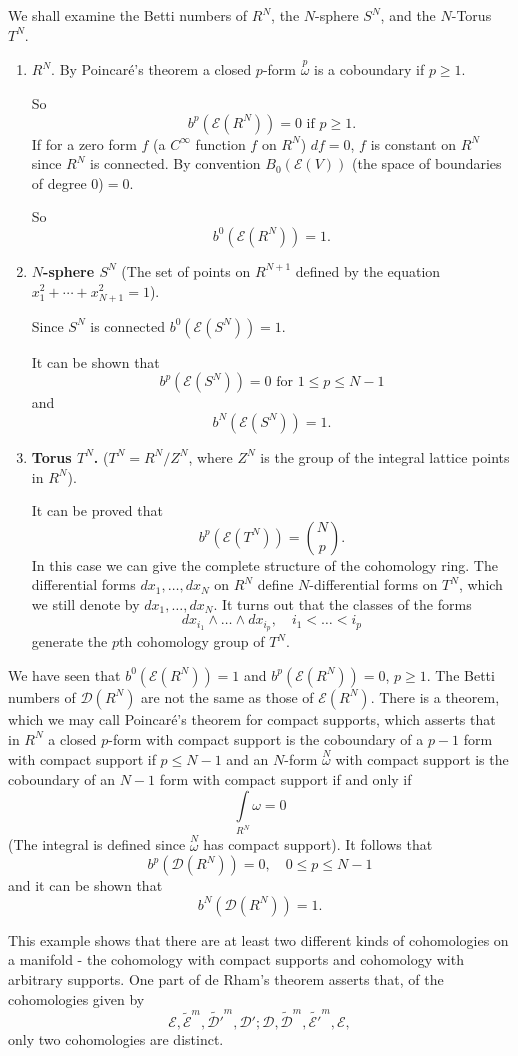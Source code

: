 We shall examine the Betti numbers of $R^{N}$, the $N$-sphere $S^{N}$,
and the $N$-Torus $T^{N}$.
\begin{enumerate}
\renewcommand{\theenumi}{\roman{enumi}}
\renewcommand{\labelenumi}{\theenumi)}
\item $R^{N}$. By Poincar\'e's theorem a closed $p$-form
  $\overset{p}{\omega}$ is a coboundary if $p\geq 1$.

So\pageoriginale
$$
b^{p}(\mathscr{E}(R^{N}))=0\text{ \  if \ } p\geq 1.
$$
If for a zero form $f$ (\iec a $C^{\infty}$ function $f$ on $R^{N}$)
$df=0$, $f$ is constant on $R^{N}$ since $R^{N}$ is connected. By
convention $B_{0}(\mathscr{E}(V))$ (the space of boundaries of degree
$0$)$= 0$.

So
$$
b^{0}(\mathscr{E}(R^{N}))=1.
$$

\item {\bf $N$-sphere $S^{N}$} (The set of points on $R^{N+1}$ defined
  by the equation $x^{2}_{1}+\cdots+x^{2}_{N+1}=1$).

Since $S^{N}$ is connected $b^{0}(\mathscr{E}(S^{N}))=1$.

It can be shown that
$$
b^{p}(\mathscr{E}(S^{N}))=0\text{ \  for \ }1\leq p\leq N-1
$$
and
$$
b^{N}(\mathscr{E}(S^{N}))=1.
$$

\item {\bf Torus $T^{N}$.} ($T^{N}=R^{N}/Z^{N}$, where $Z^{N}$ is the
  group of the integral lattice points in $R^{N}$).

It can be proved that
$$
b^{p}(\mathscr{E}(T^{N}))=\binom{N}{p}.
$$
In this case we can give the complete structure of the cohomology
ring. The differential forms $dx_{1},\ldots,dx_{N}$ on $R^{N}$ define
$N$-differential forms on $T^{N}$, which we still denote by
$dx_{1},\ldots,dx_{N}$. It turns out that the classes of the forms
$$
dx_{i_{1}}\wedge\ldots\wedge dx_{i_{p}},\quad i_{1}<\ldots<i_{p}
$$\pageoriginale
generate the $p$th cohomology group of $T^{N}$.
\end{enumerate}

We have seen that $b^{0}(\mathscr{E}(R^{N}))=1$ and
$b^{p}(\mathscr{E}(R^{N}))=0$, $p\geq 1$. The Betti numbers of
$\mathscr{D}(R^{N})$ are not the same as those of
$\mathscr{E}(R^{N})$. There is a theorem, which we may call
Poincar\'e's theorem for compact supports, which asserts that in
$R^{N}$ a closed $p$-form with compact support is the coboundary of a
$p-1$ form with compact support if $p\leq N-1$ and an $N$-form
$\overset{N}{\omega}$ with compact support is the coboundary of an
$N-1$ form with compact support if and only if
$$
\int\limits_{R^{N}}\omega=0
$$
(The integral is defined since $\overset{N}{\omega}$ has compact
support). It follows that
$$
b^{p}(\mathscr{D}(R^{N}))=0,\quad 0\leq p\leq N-1
$$
and it can be shown that
$$
b^{N}(\mathscr{D}(R^{N}))=1.
$$

This example shows that there are at least two different kinds of
cohomologies on a manifold - the cohomology with compact supports and
cohomology with arbitrary supports. One part of de Rham's theorem
asserts that, of the cohomologies given by
$$
\mathscr{E},\widetilde{\mathscr{E}}^{m},
        {\widetilde{\mathscr{D}'}^{m}}, \mathscr{D}'; \mathscr{D},
\widetilde{\mathscr{D}}^{m},\widetilde{\mathscr{E}'}^{m},\mathscr{E},
$$
only two cohomologies are distinct.


